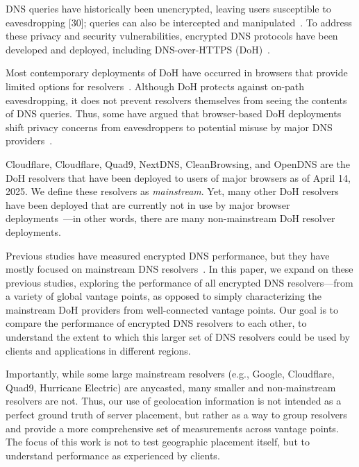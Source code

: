 DNS queries have historically been unencrypted, leaving users susceptible to eavesdropping [30]; queries can also be intercepted and manipulated~\cite{jones2016detecting}. To address these privacy and security vulnerabilities, encrypted DNS protocols have been developed and deployed, including DNS-over-HTTPS (DoH)~\cite{rfc8484}.

Most contemporary deployments of DoH have occurred in browsers that provide limited options for resolvers~\cite{chromeResolvers,ffChoices}. Although DoH protects against on-path eavesdropping, it does not prevent resolvers themselves from seeing the contents of DNS queries. Thus, some have argued that browser-based DoH deployments shift privacy concerns from eavesdroppers to potential misuse by major DNS providers~\cite{vixie}.

Cloudflare, Cloudflare, Quad9, NextDNS, CleanBrowsing, and OpenDNS are the DoH resolvers that have been deployed
to users of major browsers as of April 14,
2025.  We
define these resolvers as {\em
mainstream}.
Yet, many other DoH resolvers have been deployed that are currently
not in use by major browser deployments~\cite{dnscrypt}---in other words,
there are many non-mainstream DoH resolver deployments.  

Previous studies have measured encrypted DNS performance, but they have mostly focused on mainstream DNS resolvers~\cite{hounsel2020comparing,hounsel2021can,hoang2020k,lu2019end-to-end}.
In this paper, we expand on these previous studies, exploring the performance of all encrypted DNS resolvers—from a variety of global
vantage points, as opposed to simply characterizing the mainstream DoH providers from well-connected vantage points. Our goal is to compare the performance of encrypted DNS resolvers to each other, to understand the extent to which this larger set of DNS resolvers could be used by clients and applications in different regions. 

Importantly, while some large mainstream resolvers (e.g., Google, Cloudflare, Quad9, Hurricane Electric) are anycasted, many smaller and non-mainstream resolvers are not. Thus, our use of geolocation information is not intended as a perfect ground truth of server placement, but rather as a way to group resolvers and provide a more comprehensive set of measurements across vantage points. The focus of this work is not to test geographic placement itself, but to understand performance as experienced by clients.

